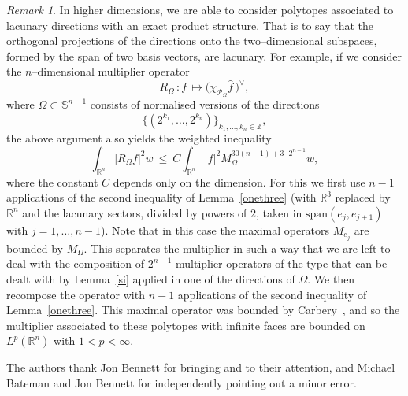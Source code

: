 \documentclass[11pt]{amsart}
\theoremstyle{definition}
\theoremstyle{remark}
\newtheorem{rem}[theorem]{Remark}
\begin{document}
\begin{rem} In higher dimensions, we are able to consider polytopes associated to lacunary directions with an exact product structure. That is to say that the orthogonal projections of the directions onto the two--dimensional subspaces, formed by the span of two basis vectors, are lacunary. For example, if we consider the $n$--dimensional multiplier operator
$$
R_{\Omega}\,:f\,\mapsto\Big(\chi_{\mathcal{P}_\Omega} \widehat{f}\,\Big)^\vee,
$$
where $\Omega\subset \mathbb{S}^{n-1}$ consists of normalised versions of the directions $$\{(2^{k_1},\ldots,2^{k_n})\}_{k_1,\ldots,k_n\in\mathbb{Z}},$$ the above argument also yields the weighted inequality
$$
\int_{\mathbb{R}^n} |R_{\Omega}f|^2 w\ {\leqslant} \  C\! \int_{\mathbb{R}^n}  |f|^2 M^{30(n-1)+3\cdot2^{n-1}}_{\Omega}\!\!w,
$$
where the constant $C$ depends only on the dimension. For this we first use $n-1$ applications of the second inequality of Lemma~\ref{onethree}  (with $\mathbb{R}^3$ replaced by $\mathbb{R}^n$ and the lacunary sectors, divided by powers of $2$, taken in $\mathrm{span}(e_j,e_{j+1})$ with $j=1,\ldots,n-1$). Note that in this case the maximal operators $M_{e_j}$ are bounded by $M_\Omega$. This separates the multiplier in such a way that we are left to deal with the composition of $2^{n-1}$ multiplier operators of the type that can be dealt with by Lemma~\ref{si} applied in one of the directions of $\Omega$. We then recompose the operator with $n-1$ applications of the second inequality of Lemma~\ref{onethree}. This maximal operator was bounded by Carbery~\cite{Ca2}, and so the multiplier associated to these polytopes with infinite faces are bounded on  $L^p(\mathbb{R}^n)$ with $1<p<\infty$.
\end{rem}

\vspace{1em}

The authors thank Jon Bennett for bringing \cite{P} and \cite{W} to their attention, and Michael Bateman and Jon Bennett for independently pointing out a minor error. 
\end{document}
